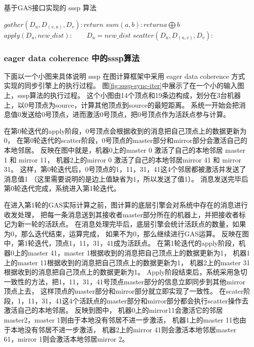 \begin{algorithm}[!htbp]
  \small
  \caption{基于GAS接口实现的 sssp 算法}\label{alg:sssp}
  \begin{algorithmic}[1]
    \State $gather(D_u,D_{(v,u)},D_v): return$     
    \State $sum(a,b) : return a\bigoplus b $ 
    \State $apply(D_u, new\_dist): 
      \qquad D_u = new\_dist$
    \State $scatter(D_u, D_{(u,v)}, D_v):$     
    \EndIf
    \EndProcedure
  \end{algorithmic}
\end{algorithm}


\subsubsection{eager data coherence 中的sssp算法}
下面以一个小图来具体说明 sssp 在图计算框架中采用 eager data coherence 方式实现的同步引擎上的执行过程。
图\ref{fig:sssp-sync-iter}中展示了在一个小的输入图上，sssp算法的执行过程。
这个小图由14个顶点和19条边构成，划分在3台机器上，以0号顶点为source，计算其他顶点到source的最短距离。
系统一开始会把消息值0发送给0号顶点，进而激活0号顶点，把0号顶点作为活跃点参与计算。

在第0轮迭代的apply阶段，0号顶点会根据收到的消息把自己顶点上的数据更新为0，
在第0轮迭代的scatter阶段，0号顶点的master部分和mirror部分会激活自己的本地邻居。
反映在图中就是，机器0上的master 0 激活了自己的本地邻居 master 1 和 mirror 11，
机器2上的mirror 0 激活了自己的本地邻居mirror 41 和 mirror 31。
这样，第0轮迭代后，0号顶点的1，11，31，41这4个邻居都被激活并发送了消息值1
（这里需要说明的是边上值缺省为1，所以发送了值1）。
消息发送完毕后第0轮迭代完成，系统进入第1轮迭代。

在进入第1轮的GAS实际计算之前，图计算的底层引擎会对系统中存在的消息进行收发处理，
把每一条消息送到其接收者master部分所在的机器上，并把接收者标记为新一轮的活跃点。
在消息处理完毕后，底层引擎会统计活跃点的数量，如果为0，那么迭代结束，运算完成，
如果不为0，那么继续进行GAS运算。
反映在图中，第1轮迭代，顶点1，11，31，41成为活跃点。
在第1轮迭代的apply阶段，机器0上的master 41，master 1根据收到的消息把自己顶点上的数据更新为1，
机器1上的master 11根据收到的消息把自己顶点上的数据更新为1，
机器2上的master 31根据收到的消息把自己顶点上的数据更新为1。
Apply阶段结束后，系统采用急切一致性的方法，把1，11，31，41号顶点master部分的信息立即同步到其他mirror顶点上去，
这样顶点的master部分和mirror部分就立即实现了一致性。
在scater阶段，1，11，31，41这4个活跃点的master部分和mirror部分都会执行scatter操作去激活自己的本地邻居。
反映到图中，
机器0上的mirror11会激活它的邻居master2，master 1则由于本地没有邻居不进一步激活，
机器1上的master 11也由于本地没有邻居不进一步激活，
机器2上的mirror 41则会激活本地邻居master 61，mirror 1则会激活本地邻居mirror 2。

